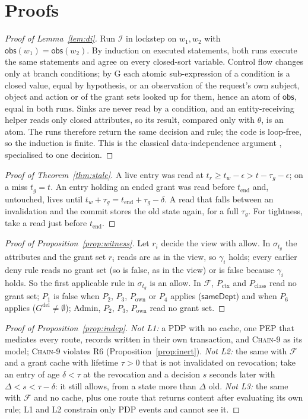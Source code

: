 \documentclass[sigconf,review,anonymous]{acmart}
\newcommand{\chain}{\textsc{Chain-9}\xspace}
\newcommand{\Pc}{P_{\mathrm{class}}}
\newcommand{\Px}{P_{\mathrm{ctx}}}
\newcommand{\Po}{P_{\mathrm{own}}}
\newcommand{\Gdel}{G^{\mathrm{del}}}
\newcommand{\sameDept}{\mathsf{sameDept}}
\newcommand{\obs}{\mathsf{obs}}
\begin{document}
\section{Proofs}
\label{app:proofs}
\begin{proof}[Proof of Lemma~\ref{lem:di}]
Run $\mathcal{I}$ in lockstep on $w_1,w_2$ with $\obs(w_1)=\obs(w_2)$. By induction on executed statements, both
runs execute the same statements and agree on every closed-sort variable. Control flow changes only at branch
conditions; by G each atomic sub-expression of a condition is a closed value, equal by hypothesis, or an
observation of the request's own subject, object and action or of the grant sets looked up for them, hence an atom
of $\obs$, equal in both runs. Sinks are never read by a condition, and an entity-receiving helper reads only
closed attributes, so its result, compared only with $\theta$, is an atom. The runs therefore return the same
decision and rule; the code is loop-free, so the induction is finite. This is the classical data-independence
argument \cite{wolper1986,lazic2003semantic}, specialised to one decision.
\end{proof}

\begin{proof}[Proof of Theorem~\ref{thm:stale}]
A live entry was read at $t_r\ge t_w-\epsilon>t-\tau_g-\epsilon$; on a miss $t_g=t$. An entry holding an ended grant
was read before $t_{\mathrm{end}}$ and, untouched, lives until $t_w+\tau_g=t_{\mathrm{end}}+\tau_g-\delta$. A read
that falls between an invalidation and the commit stores the old state again, for a full $\tau_g$. For tightness,
take a read just before $t_{\mathrm{end}}$.
\end{proof}

\begin{proof}[Proof of Proposition~\ref{prop:witness}]
Let $r_i$ decide the view with allow. In $\sigma_{t_g}$ the attributes and the grant set $r_i$ reads are as in the
view, so $\gamma_i$ holds; every earlier deny rule reads no grant set (so is false, as in the view) or is false
because $\gamma_i$ holds. So the first applicable rule in $\sigma_{t_g}$ is an allow. In $\mathcal{F}$, $\Px$ and $\Pc$
read no grant set; $P_1$ is false when $P_2$, $P_3$, $\Po$ or $P_4$ applies ($\sameDept$) and when $P_6$ applies
($\Gdel\neq\emptyset$); Admin, $P_2$, $P_3$, $\Po$ read no grant set.
\end{proof}

\begin{proof}[Proof of Proposition~\ref{prop:indep}]
\emph{Not L1:} a PDP with no cache, one PEP that mediates every route, records written in their own transaction,
and \chain as its model; \chain violates R6 (Proposition~\ref{prop:inert}). \emph{Not L2:} the same with
$\mathcal{F}$ and a grant cache with lifetime $\tau>0$ that is not invalidated on revocation; take an entry of age
$\delta<\tau$ at the revocation and a decision $s$ seconds later with $\Delta<s<\tau-\delta$: it still allows, from
a state more than $\Delta$ old. \emph{Not L3:} the same with $\mathcal{F}$ and no cache, plus one route that returns
content after evaluating its own rule; L1 and L2 constrain only PDP events and cannot see it.
\end{proof}
\end{document}
